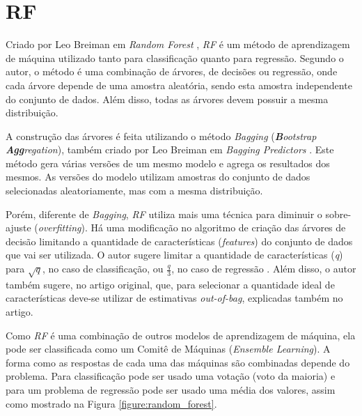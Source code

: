 
\section{\acrfull{RF}}

Criado por Leo Breiman em \textit{Random Forest} \cite{Breiman:2001:RF:570181.570182}, \textit{\acrshort{RF}} é um método de aprendizagem de máquina utilizado tanto para classificação quanto para regressão. Segundo o autor, o método é uma combinação de árvores, de decisões ou regressão, onde cada árvore depende de uma amostra aleatória, sendo esta amostra independente do conjunto de dados. Além disso, todas as árvores devem possuir a mesma distribuição. 

A construção das árvores é feita utilizando o método \textit{Bagging} (\textit{\textbf{B}ootstrap \textbf{Agg}regation}), também criado por Leo Breiman em \textit{Bagging Predictors} \cite{Breiman:1996:BP:231986.231989}. Este método gera várias versões de um mesmo modelo e agrega os resultados dos mesmos. As versões do modelo utilizam amostras do conjunto de dados selecionadas aleatoriamente, mas com a mesma distribuição.

Porém, diferente de \textit{Bagging}, \textit{\acrshort{RF}} utiliza mais uma técnica para diminuir o sobre-ajuste (\textit{overfitting}). Há uma modificação no algoritmo de criação das árvores de decisão limitando a quantidade de características (\textit{features}) do conjunto de dados que vai ser utilizada. O autor sugere limitar a quantidade de características (\textit{q}) para $ \sqrt{q} $, no caso de classificação, ou $ \frac{q}{3} $, no caso de regressão \cite{hastie2005elements}. Além disso, o autor também sugere, no artigo original, que, para selecionar a quantidade ideal de características deve-se utilizar de estimativas \textit{out-of-bag}, explicadas também no artigo.

Como \textit{\acrshort{RF}} é uma combinação de outros modelos de aprendizagem de máquina, ela pode ser classificada como um Comitê de Máquinas (\textit{Ensemble Learning}). A forma como as respostas de cada uma das máquinas são combinadas depende do problema. Para classificação pode ser usado uma votação (voto da maioria) e para um problema de regressão pode ser usado uma média dos valores, assim como mostrado na Figura \ref{figure:random_forest}.

